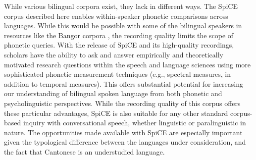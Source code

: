 While various bilingual corpora exist, they lack in different ways. The SpiCE corpus described here enables within-speaker phonetic comparisons across languages. While this would be possible with some of the bilingual speakers in resources like the Bangor corpora \citep{deuchar_2014_corpora}, the recording quality limits the scope of phonetic queries. With the release of SpiCE and its high-quality recordings, scholars have the ability to ask and answer empirically and theoretically motivated research questions within the speech and language sciences using more sophisticated phonetic measurement techniques (e.g., spectral measures, in addition to temporal measures). This offers substantial potential for increasing our understanding of bilingual spoken language from both phonetic and psycholinguistic perspectives. While the recording quality of this corpus offers these particular advantages, SpiCE is also suitable for any other standard corpus-based inquiry with conversational speech, whether linguistic or paralinguistic in nature. The opportunities made available with SpiCE are especially important given the typological difference between the languages under consideration, and the fact that Cantonese is an understudied language. 

\endinput %
